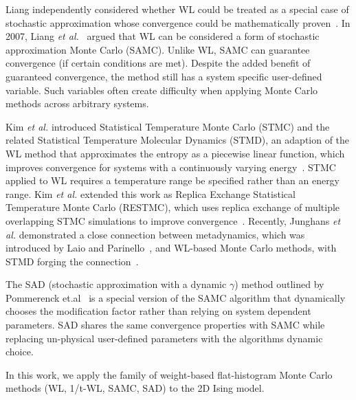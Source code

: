 Liang independently considered whether WL could be treated as a special case of
stochastic approximation whose convergence could be mathematically
proven~\cite{liang2006theory, liang2007stochastic}. In 2007, Liang \emph{et
al.}~\cite{liang2007stochastic} argued that WL can be considered a form of
stochastic approximation Monte Carlo (SAMC). Unlike WL, SAMC can guarantee
convergence (if certain conditions are met). Despite the added benefit of
guaranteed convergence, the method still has a system specific user-defined
variable. Such variables often create difficulty when applying Monte Carlo
methods across arbitrary systems.

Kim \emph{et al.} introduced Statistical Temperature Monte Carlo (STMC) and the
related Statistical Temperature Molecular Dynamics (STMD), an adaption
of the WL method that approximates the entropy as a piecewise linear function,
which improves convergence for systems with a continuously varying
energy~\cite{kim2006statistical, kim2007statistical}. STMC applied to WL
requires a temperature range be specified rather than an energy range.  Kim
\emph{et al.} extended this work as Replica Exchange Statistical Temperature
Monte Carlo (RESTMC), which uses replica exchange of multiple overlapping STMC
simulations to improve convergence~\cite{kim2009replica}. Recently,
Junghans \emph{et al.} demonstrated a close connection between
metadynamics, which was introduced by Laio and
Parinello~\cite{laio2002escaping}, and WL-based Monte Carlo methods, with STMD
forging the connection~\cite{junghans2014molecular}.

The SAD (stochastic approximation with a
dynamic $\gamma$) method outlined by Pommerenck
et.al~\cite{pommerenck2020stochastic} is a special version of the SAMC algorithm
that dynamically chooses the modification factor rather than relying on system
dependent parameters. SAD shares the same convergence properties with SAMC while
replacing un-physical user-defined parameters with the algorithms dynamic
choice.

In this work, we apply the family of weight-based flat-histogram Monte
Carlo methods (WL, 1/t-WL, SAMC, SAD) to the 2D Ising model.

